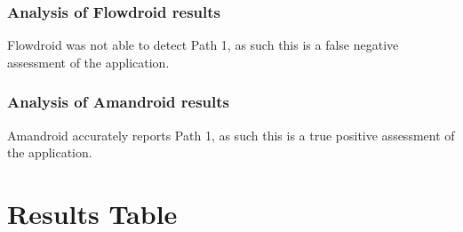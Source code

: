 \documentclass[journal]{IEEEtran}
\begin{document}
\subsubsection{Analysis of Flowdroid results}
Flowdroid was not able to detect Path 1, as such this is a false negative assessment of the application. 
\subsubsection{Analysis of Amandroid results}
Amandroid accurately reports  Path 1, as such this is a true positive assessment of the application.
   
\newpage
\newcommand{\specialcell}[2][c]{%
  \begin{tabular}[#1]{@{}c@{}}#2\end{tabular}}
\section{Results Table}
\end{document}
